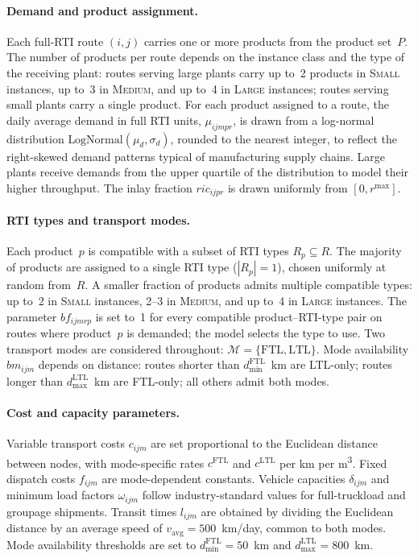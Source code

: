 \paragraph{Demand and product assignment.}
Each full-RTI route $(i,j)$ carries one or more products from the
product set~$P$. The number of products per route depends on the
instance class and the type of the receiving plant: routes serving
large plants carry up to~2 products in \textsc{Small} instances,
up to~3 in \textsc{Medium}, and up to~4 in \textsc{Large}
instances; routes serving small plants carry a single product. For
each product assigned to a route, the daily average demand in full
RTI units, $\mu_{ijmpr}$, is drawn from a log-normal distribution
$\text{LogNormal}(\mu_d, \sigma_d)$, rounded to the nearest integer,
to reflect the right-skewed demand patterns typical of manufacturing
supply chains. Large plants receive demands from the upper quartile
of the distribution to model their higher throughput. The inlay
fraction $ric_{ijpr}$ is drawn uniformly from $[0, r^{\max}]$.

\paragraph{RTI types and transport modes.}
Each product~$p$ is compatible with a subset of RTI types
$R_p \subseteq R$. The majority of products are assigned to a
single RTI type ($|R_p|=1$), chosen uniformly at random from~$R$.
A smaller fraction of products admits multiple compatible types:
up to~2 in \textsc{Small} instances, 2--3 in \textsc{Medium}, and
up to~4 in \textsc{Large} instances. The parameter $bf_{ijmrp}$ is
set to~1 for every compatible product--RTI-type pair on routes where
product~$p$ is demanded; the model selects the type to use.
Two transport modes are considered throughout:
$\mathcal{M} = \{\text{FTL}, \text{LTL}\}$. Mode availability
$bm_{ijm}$ depends on distance: routes shorter than
$d^{\text{FTL}}_{\min}$~km are LTL-only; routes longer than
$d^{\text{LTL}}_{\max}$~km are FTL-only; all others admit both modes.

\paragraph{Cost and capacity parameters.}
Variable transport costs $c_{ijm}$ are set proportional to the
Euclidean distance between nodes, with mode-specific rates
$c^{\text{FTL}}$ and $c^{\text{LTL}}$ per km per m\textsuperscript{3}.
Fixed dispatch costs $f_{ijm}$ are mode-dependent constants.
Vehicle capacities $\delta_{ijm}$ and minimum load factors
$\omega_{ijm}$ follow industry-standard values for full-truckload
and groupage shipments. Transit times $l_{ijm}$ are obtained by
dividing the Euclidean distance by an average speed of
$v_{\text{avg}} = 500$~km/day, common to both modes.
Mode availability thresholds are set to
$d^{\text{FTL}}_{\min} = 50$~km and $d^{\text{LTL}}_{\max} = 800$~km.

